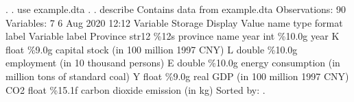 . 
. use example.dta
{\smallskip}
. 
. describe 
{\smallskip}
Contains data from example.dta
 Observations:            90                  
    Variables:             7                  6 Aug 2020 12:12
Variable      Storage   Display    Value
    name         type    format    label      Variable label
Province        str12   \%12s                  province name
year            int     \%10.0g                year
K               float   \%9.0g                 capital stock (in 100 million 1997 CNY)
L               double  \%10.0g                employment (in 10 thousand persons)
E               double  \%10.0g                energy consumption (in million tons of standard coal)
Y               float   \%9.0g                 real GDP (in 100 million 1997 CNY)
CO2             float   \%15.1f                carbon dioxide emission (in kg)
Sorted by: 
{\smallskip}
. 
